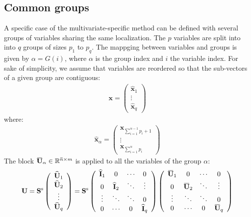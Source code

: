 \documentclass[12pt]{scrartcl}
\newcommand{\overbar}[1]{\mkern 1.5mu\overline{\mkern-1.5mu#1\mkern-1.5mu}\mkern 1.5mu}
\begin{document}
\subsection{Common groups}
A specific case of the multivariate-specific method can be defined with several groups of variables sharing the same localization. The $p$ variables are split into into $q$ groups of sizes $p_1$ to $p_q$. The mappging between variables and groups is given by $\alpha = G(i)$, where $\alpha$ is the group index and $i$ the variable index. For sake of simplicity, we assume that variables are reordered so that the sub-vectors of a given group are contiguous:
\begin{align}
\mathbf{x} = \left( \begin{array}{c}
\widehat{\mathbf{x}}_1 \\[1ex]
\hline
\vdots \\
\hline
\widehat{\mathbf{x}}_{q}
\end{array} \right)
\end{align}
where:
\begin{align}
\widehat{\mathbf{x}}_\alpha = \left( \begin{array}{c}
\mathbf{x}_{\sum_{i=1}^{\alpha-1} p_i+1} \\[1ex]
\hline
\vdots \\
\hline
\mathbf{x}_{\sum_{i=1}^\alpha p_i}
\end{array} \right)
\end{align}
The block $\overbar{\mathbf{U}}_\alpha \in \mathbb{R}^{\overbar{n} \times m}$ is applied to all the variables of the group $\alpha$:
\begin{align}
\mathbf{U} = \mathbf{S}^\mathrm{s} \left( \begin{array}{c}
\widehat{\mathbf{U}}_1\\
\widehat{\mathbf{U}}_2 \\
\vdots \\
\widehat{\mathbf{U}}_q \\
\end{array} \right) = \mathbf{S}^\mathrm{s} \left( \begin{array}{cccc}
\widehat{\mathbf{I}}_1 & 0 & \cdots & 0 \\
0 & \widehat{\mathbf{I}}_2 & \ddots & \vdots \\
\vdots & \ddots & \ddots & 0 \\
0 & \cdots & 0 & \widehat{\mathbf{I}}_q
\end{array} \right) \left( \begin{array}{cccc}
\overbar{\mathbf{U}}_1 & 0 & \cdots & 0 \\
0 & \overbar{\mathbf{U}}_2 & \ddots & \vdots \\
\vdots & \ddots & \ddots & 0 \\
0 & \cdots & 0 & \overbar{\mathbf{U}}_q
\end{array} \right)
\end{align}
\end{document}
